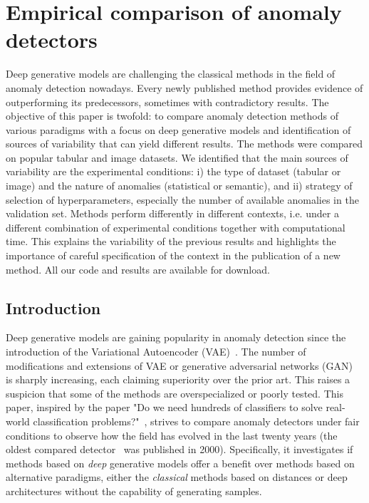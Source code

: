 \chapter{Empirical comparison of anomaly detectors}
Deep generative models are challenging the classical methods in the field of anomaly detection nowadays. Every newly published method provides evidence of outperforming its predecessors, sometimes with contradictory results. The objective of this paper is twofold: to compare anomaly detection methods of various paradigms with a focus on deep generative models and identification of sources of variability that can yield different results. The methods were compared on popular tabular and image datasets. We identified that the main sources of variability are the experimental conditions: i) the type of dataset (tabular or image) and the nature of anomalies (statistical or semantic), and ii) strategy of selection of hyperparameters, especially the number of available anomalies in the validation set. Methods perform differently in different contexts, i.e. under a different combination of experimental conditions together with computational time. This explains the variability of the previous results and highlights the importance of careful specification of the context in the publication of a new method. All our code and results are available for download.

\section{Introduction}
Deep generative models are gaining popularity in anomaly detection since the introduction of the Variational Autoencoder (VAE)~\cite{kingma2013auto}. The number of modifications and extensions of VAE or generative adversarial networks (GAN)~\cite{goodfellow2014generative} is sharply increasing, each claiming superiority over the prior art. This raises a suspicion that some of the methods are overspecialized or poorly tested. This paper, inspired by the paper "Do we need hundreds of classifiers to solve real-world classification problems?"~\cite{fernandez2014we}, strives to compare anomaly detectors under fair conditions to observe how the field has evolved in the last twenty years (the oldest compared detector~\cite{ramaswamy2000efficient} was published in 2000). Specifically, it investigates if methods based on \textit{deep} generative models offer a benefit over methods based on alternative paradigms, either the \textit{classical} methods based on distances or deep architectures without the capability of generating samples.

